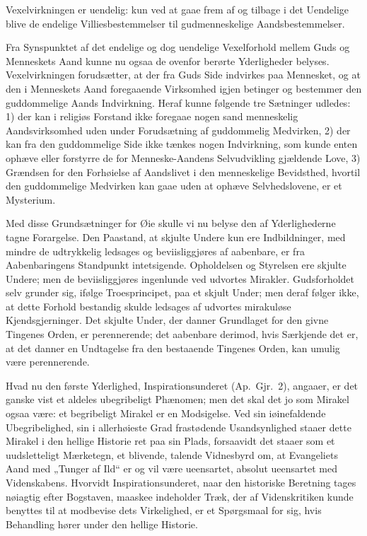 \documentclass[12pt]{book}
\begin{document}
Vexelvirkningen er uendelig: kun ved at gaae frem af og tilbage i
det Uendelige blive de endelige Villiesbestemmelser til
gudmenneskelige Aandsbestemmelser.

Fra Synspunktet af det endelige og dog uendelige Vexelforhold mellem
Guds og Menneskets Aand kunne nu ogsaa de ovenfor berørte
Yderligheder belyses. Vexelvirkningen forudsætter, at der fra Guds
Side indvirkes paa Mennesket, og at den i Menneskets Aand
foregaaende Virksomhed igjen betinger og bestemmer den guddommelige
Aands Indvirkning. Heraf kunne følgende tre Sætninger udledes: 1)
der kan i religiøs Forstand ikke foregaae nogen sand menneskelig
Aandsvirksomhed uden under Forudsætning af guddommelig Medvirken, 2)
der kan fra den guddommelige Side ikke tænkes nogen Indvirkning, som
kunde enten ophæve eller forstyrre de for
Menneske-Aandens Selvudvikling gjældende Love, 3) Grændsen for den
Forhøielse af Aandslivet i den menneskelige Bevidsthed, hvortil den
guddommelige Medvirken kan gaae uden at ophæve Selvhedslovene, er et
Mysterium.

Med disse Grundsætninger for Øie skulle vi nu belyse den af
Yderlighederne tagne Forargelse. Den Paastand, at skjulte Undere kun
ere Indbildninger, med mindre de udtrykkelig ledsages og
beviisliggjøres af aabenbare, er fra Aabenbaringens Standpunkt
intetsigende. Opholdelsen og Styrelsen ere skjulte Undere; men de
beviisliggjøres ingenlunde ved udvortes Mirakler. Gudsforholdet selv
grunder sig, ifølge Troesprincipet, paa et skjult Under; men deraf
følger ikke, at dette Forhold bestandig skulde ledsages af udvortes
mirakuløse Kjendsgjerninger. Det skjulte Under, der danner
Grundlaget for den givne Tingenes Orden, er perennerende; det
aabenbare derimod, hvis Særkjende det er, at det danner en
Undtagelse fra den bestaaende Tingenes Orden, kan umulig være
perennerende.

Hvad nu den første Yderlighed, Inspirationsunderet (Ap.\ Gjr.\ 2),
angaaer, er det ganske vist et aldeles ubegribeligt Phænomen; men
det skal det jo som Mirakel ogsaa være: et begribeligt Mirakel er en
Modsigelse. Ved sin iøinefaldende Ubegribelighed, sin i allerhøieste
Grad frastødende Usandsynlighed staaer dette Mirakel i den hellige
Historie ret paa sin Plads, forsaavidt det staaer som et
uudsletteligt Mærketegn, et blivende, talende Vidnesbyrd om, at
Evangeliets Aand med „Tunger af Ild“ er og vil være ueensartet,
absolut ueensartet med Videnskabens. Hvorvidt Inspirationsunderet,
naar den historiske Beretning tages nøiagtig efter Bogstaven,
maaskee indeholder Træk, der af Videnskritiken kunde benyttes til at
modbevise dets Virkelighed, er et Spørgsmaal for sig, hvis
Behandling hører under den hellige Historie.
\end{document}
